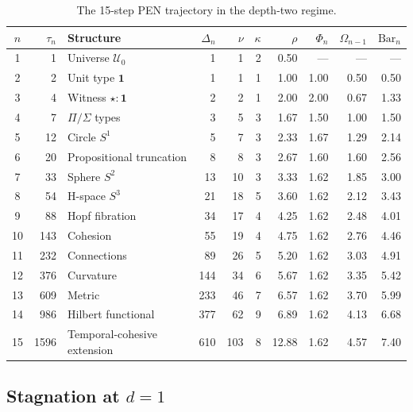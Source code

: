 \documentclass[11pt,a4paper]{article}
\theoremstyle{plain}
\theoremstyle{definition}
\theoremstyle{remark}
\newcommand{\U}{\mathcal{U}}
\newcommand{\SelBar}{\mathrm{Bar}}
\begin{document}
\begin{table}[tbp]
\centering
\caption{The 15-step PEN trajectory in the depth-two regime.}
\label{tab:genesis}
\small
\begin{tabular}{@{}crlrrrrrrr@{}}
\toprule
$n$ & $\tau_n$ & Structure & $\Delta_n$ & $\nu$ & $\kappa$ & $\rho$ & $\Phi_n$ & $\Omega_{n-1}$ & $\SelBar_n$ \\
\midrule
1  & 1    & Universe $\U_0$              & 1   & 1   & 2 & 0.50  & ---  & ---  & ---  \\
2  & 2    & Unit type $\mathbf{1}$       & 1   & 1   & 1 & 1.00  & 1.00 & 0.50 & 0.50 \\
3  & 4    & Witness $\star:\mathbf{1}$   & 2   & 2   & 1 & 2.00  & 2.00 & 0.67 & 1.33 \\
4  & 7    & $\Pi/\Sigma$ types           & 3   & 5   & 3 & 1.67  & 1.50 & 1.00 & 1.50 \\
\midrule
5  & 12   & Circle $S^1$                 & 5   & 7   & 3 & 2.33  & 1.67 & 1.29 & 2.14 \\
6  & 20   & Propositional truncation     & 8   & 8   & 3 & 2.67  & 1.60 & 1.60 & 2.56 \\
7  & 33   & Sphere $S^2$                 & 13  & 10  & 3 & 3.33  & 1.62 & 1.85 & 3.00 \\
8  & 54   & H-space $S^3$                & 21  & 18  & 5 & 3.60  & 1.62 & 2.12 & 3.43 \\
9  & 88   & Hopf fibration               & 34  & 17  & 4 & 4.25  & 1.62 & 2.48 & 4.01 \\
\midrule
10 & 143  & Cohesion                     & 55  & 19  & 4 & 4.75  & 1.62 & 2.76 & 4.46 \\
11 & 232  & Connections                  & 89  & 26  & 5 & 5.20  & 1.62 & 3.03 & 4.91 \\
12 & 376  & Curvature                    & 144 & 34  & 6 & 5.67  & 1.62 & 3.35 & 5.42 \\
13 & 609  & Metric                       & 233 & 46  & 7 & 6.57  & 1.62 & 3.70 & 5.99 \\
14 & 986  & Hilbert functional           & 377 & 62  & 9 & 6.89  & 1.62 & 4.13 & 6.68 \\
\midrule
15 & 1596 & Temporal-cohesive extension  & 610 & 103 & 8 & 12.88 & 1.62 & 4.57 & 7.40 \\
\bottomrule
\end{tabular}
\end{table}

\subsection{\texorpdfstring{Stagnation at $d=1$}{Stagnation at d=1}}
\end{document}
